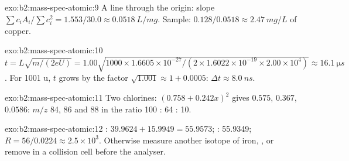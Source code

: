 \begin{solution}{exo:b2:mass-spec-atomic:9}
A line through the origin: slope $\sum c_iA_i/\sum c_i^2 = 1.553/30.0 \approx \qty{0.0518}{L/mg}$. Sample:
$0.128/0.0518 \approx \qty{2.47}{mg/L}$ of copper.
\end{solution}

\begin{solution}{exo:b2:mass-spec-atomic:10}
$t = L\sqrt{m/(2eU)} = 1.00\sqrt{1000 \times 1.6605 \times 10^{-27}/(2 \times 1.6022 \times 10^{-19}
\times 2.00 \times 10^4)} \approx \qty{16.1}{\micro s}$. For 1001 u, $t$ grows by the factor
$\sqrt{1.001} \approx 1 + 0.0005$: $\Delta t \approx \qty{8.0}{ns}$.
\end{solution}

\begin{solution}{exo:b2:mass-spec-atomic:11}
Two chlorines: $(0.758 + 0.242x)^2$ gives $0.575$, $0.367$, $0.0586$: $m/z$ 84, 86 and 88 in the ratio
100 : 64 : 10.
\end{solution}

\begin{solution}{exo:b2:mass-spec-atomic:12}
: $39.9624 + 15.9949 = 55.9573$; : 55.9349; $R = 56/0.0224 \approx 2.5 \times
10^3$. Otherwise measure another isotope of iron, , or remove  in a collision cell
before the analyser.
\end{solution}

